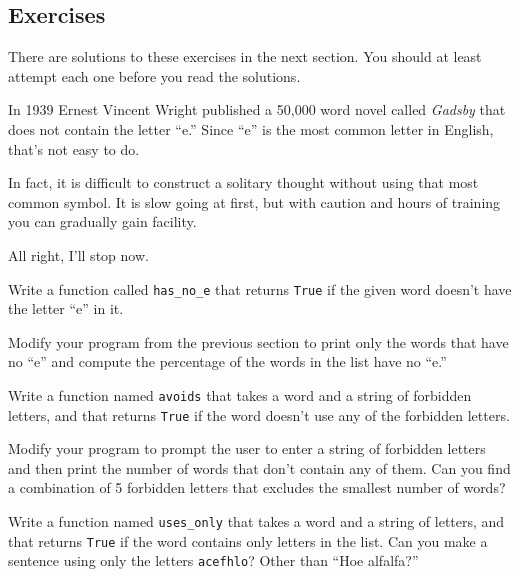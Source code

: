 \documentclass[10pt]{book}
\begin{document}
\begin{CJK}{UTF8}{gbsn}
\section{Exercises}

There are solutions to these exercises in the next section.
You should at least attempt each one before you read the solutions.

\begin{exercise}

In 1939 Ernest Vincent Wright published a 50,000 word novel called
{\em Gadsby} that does not contain the letter ``e.''  Since ``e'' is
the most common letter in English, that's not easy to do.

In fact, it is difficult to construct a solitary thought without using
that most common symbol.  It is slow going at first, but with caution
and hours of training you can gradually gain facility.

All right, I'll stop now.

Write a function called \verb"has_no_e" that returns {\tt True} if
the given word doesn't have the letter ``e'' in it.

Modify your program from the previous section to print only the words
that have no ``e'' and compute the percentage of the words in the list
have no ``e.''

\end{exercise}


\begin{exercise} 

Write a function named {\tt avoids}
that takes a word and a string of forbidden letters, and
that returns {\tt True} if the word doesn't use any of the forbidden
letters.

Modify your program to prompt the user to enter a string
of forbidden letters and then print the number of words that
don't contain any of them.
Can you find a combination of 5 forbidden letters that
excludes the smallest number of words?

\end{exercise}



\begin{exercise}

Write a function named \verb"uses_only" that takes a word and a
string of letters, and that returns {\tt True} if the word contains
only letters in the list.  Can you make a sentence using only the
letters {\tt acefhlo}?  Other than ``Hoe alfalfa?''


\end{exercise}
\end{CJK}
\end{document}

